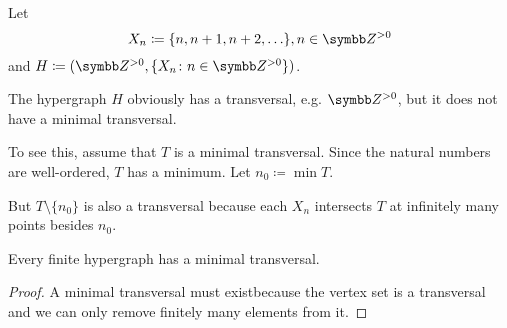 \begin{example}\label{ex:no_minimal_set_transversal}
  Let
  \begin{equation*}
    X_n \coloneqq \{ n, n + 1, n + 2, \ldots \}, n \in \Z^{>0}
  \end{equation*}
  and \( H \coloneqq (\Z^{>0}, \{ X_n \colon n \in \Z^{>0} \}) \).

  The hypergraph \( H \) obviously has a transversal, e.g. \( \Z^{>0} \), but it does not have a minimal transversal.

  To see this, assume that \( T \) is a minimal transversal. Since the natural numbers are well-ordered, \( T \) has a minimum. Let \( n_0 \coloneqq \min T \).

  But \( T \setminus \{ n_0 \} \) is also a transversal because each \( X_n \) intersects \( T \) at infinitely many points besides \( n_0 \).
\end{example}

\begin{proposition}\label{thm:finite_hypergraphs_have_minimal_transversal}
  Every finite hypergraph has a minimal transversal.
\end{proposition}
\begin{proof}
  A minimal transversal must exist\LEM because the vertex set is a transversal and we can only remove finitely many elements from it.
\end{proof}
